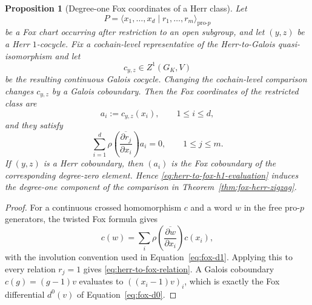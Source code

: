 \documentclass[11pt]{article}
\newtheorem{proposition}[theorem]{Proposition}
\theoremstyle{definition}
\begin{document}
\begin{proposition}[Degree-one Fox coordinates of a Herr class]\label{prop:herr-to-fox-h1}
Let
\[
 P=\langle x_1,\ldots,x_d\mid r_1,\ldots,r_m\rangle_{\mathrm{pro}\text{-}p}
\]
be a Fox chart occurring after restriction to an open subgroup, and let $(y,z)$ be a Herr $1$-cocycle.  Fix a cochain-level representative of the Herr-to-Galois quasi-isomorphism and let
\[
 c_{y,z}\in Z^1(G_K,V)
\]
be the resulting continuous Galois cocycle.  Changing the cochain-level comparison changes $c_{y,z}$ by a Galois coboundary.  Then the Fox coordinates of the restricted class are
\begin{equation}\label{eq:herr-to-fox-h1-evaluation}
 a_i:=c_{y,z}(x_i),
 \qquad 1\le i\le d,
\end{equation}
and they satisfy
\begin{equation}\label{eq:herr-to-fox-relation}
 \sum_{i=1}^d
 \rho\!\left(
 \overline{\frac{\partial r_j}{\partial x_i}}
 \right)a_i
 =0,
 \qquad 1\le j\le m.
\end{equation}
If $(y,z)$ is a Herr coboundary, then $(a_i)$ is the Fox coboundary of the corresponding degree-zero element.  Hence \eqref{eq:herr-to-fox-h1-evaluation} induces the degree-one component of the comparison in Theorem~\ref{thm:fox-herr-zigzag}.
\end{proposition}

\begin{proof}
For a continuous crossed homomorphism $c$ and a word $w$ in the free pro-$p$ generators, the twisted Fox formula gives
\[
 c(w)
 =
 \sum_i
 \rho\!\left(
 \overline{\frac{\partial w}{\partial x_i}}
 \right)c(x_i),
\]
with the involution convention used in Equation~\eqref{eq:fox-d1}.  Applying this to every relation $r_j=1$ gives \eqref{eq:herr-to-fox-relation}.  A Galois coboundary $c(g)=(g-1)v$ evaluates to $((x_i-1)v)_i$, which is exactly the Fox differential $d^0(v)$ of Equation~\eqref{eq:fox-d0}.
\end{proof}
\end{document}
